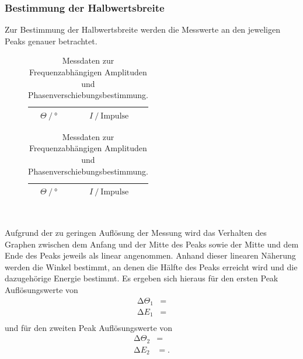 \subsubsection{Bestimmung der Halbwertsbreite}
Zur Bestimmung der Halbwertsbreite werden die Messwerte an den jeweligen Peaks genauer betrachtet.

\begin{table}
  \hspace*{\fill}
  \begin{subfigure}{0.40\textwidth}
  \centering
  \label{tab:2a}
  \begin{tabular}{c c}
    \toprule
     {$\Theta \:/\: \si{\degree}$} & {$I \:/\: \text{Impulse}$}\\
    \midrule
    
    \bottomrule
  \end{tabular}
\end{subfigure}
\hspace*{\fill}
\begin{subfigure}{0.40\textwidth}
  \centering
  \label{tab:2b}
  \begin{tabular}{c c}
    \toprule
     {$\Theta \:/\: \si{\degree}$} & {$I \:/\: \text{Impulse}$}\\
    \midrule
    
    \bottomrule
  \end{tabular}
\end{subfigure}
\\
\hspace*{\fill}
\hspace*{\fill}
\caption{Messdaten zur Frequenzabhängigen Amplituden und Phasenverschiebungsbestimmung.}
\label{tab:2}
\end{table}
Aufgrund der zu geringen Auflösung der Messung wird das Verhalten des Graphen zwischen dem Anfang und der Mitte des Peaks sowie der Mitte und dem Ende des Peaks jeweils als linear angenommen.
Anhand dieser linearen Näherung werden die Winkel bestimmt, an denen die Hälfte des Peaks erreicht wird und die dazugehörige Energie bestimmt.
Es ergeben sich hieraus für den ersten Peak Auflösungswerte von
\begin{align*}
  \increment \Theta_1 &=  \\
  \increment E_1 &=  \\
\end{align*}
und für den zweiten Peak Auflösungswerte von
\begin{align*}
  \increment \Theta_2 &=  \\
  \increment E_2 &= . \\
\end{align*}

